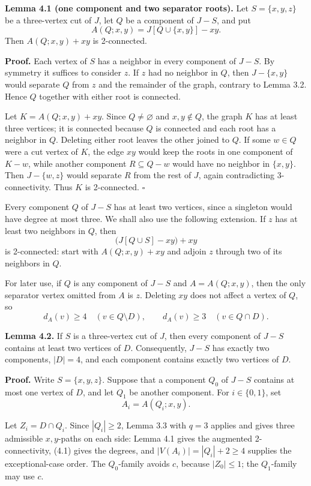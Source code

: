 \documentclass[
  11pt]{article}
\begin{document}
\textbf{Lemma 4.1 (one component and two separator roots).} Let
\(S=\{x,y,z\}\) be a three-vertex cut of \(J\), let \(Q\) be a component
of \(J-S\), and put \[
 A(Q;x,y)=J[Q\cup\{x,y\}]-xy.
\] Then \(A(Q;x,y)+xy\) is 2-connected.

\textbf{Proof.} Each vertex of \(S\) has a neighbor in every component
of \(J-S\). By symmetry it suffices to consider \(z\). If \(z\) had no
neighbor in \(Q\), then \(J-\{x,y\}\) would separate \(Q\) from \(z\)
and the remainder of the graph, contrary to Lemma 3.2. Hence \(Q\)
together with either root is connected.

Let \(K=A(Q;x,y)+xy\). Since \(Q\ne\varnothing\) and \(x,y\notin Q\),
the graph \(K\) has at least three vertices; it is connected because
\(Q\) is connected and each root has a neighbor in \(Q\). Deleting
either root leaves the other joined to \(Q\). If some \(w\in Q\) were a
cut vertex of \(K\), the edge \(xy\) would keep the roots in one
component of \(K-w\), while another component \(R\subseteq Q-w\) would
have no neighbor in \(\{x,y\}\). Then \(J-\{w,z\}\) would separate \(R\)
from the rest of \(J\), again contradicting 3-connectivity. Thus \(K\)
is 2-connected. \(\square\)

Every component \(Q\) of \(J-S\) has at least two vertices, since a
singleton would have degree at most three. We shall also use the
following extension. If \(z\) has at least two neighbors in \(Q\), then
\[
 \bigl(J[Q\cup S]-xy\bigr)+xy
\] is 2-connected: start with \(A(Q;x,y)+xy\) and adjoin \(z\) through
two of its neighbors in \(Q\).

For later use, if \(Q\) is any component of \(J-S\) and \(A=A(Q;x,y)\),
then the only separator vertex omitted from \(A\) is \(z\). Deleting
\(xy\) does not affect a vertex of \(Q\), so \[
 d_A(v)\ge4\quad(v\in Q\setminus D),
 \qquad
 d_A(v)\ge3\quad(v\in Q\cap D). \tag{4.1}
\]

\textbf{Lemma 4.2.} If \(S\) is a three-vertex cut of \(J\), then every
component of \(J-S\) contains at least two vertices of \(D\).
Consequently, \(J-S\) has exactly two components, \(|D|=4\), and each
component contains exactly two vertices of \(D\).

\textbf{Proof.} Write \(S=\{x,y,z\}\). Suppose that a component \(Q_0\)
of \(J-S\) contains at most one vertex of \(D\), and let \(Q_1\) be
another component. For \(i\in\{0,1\}\), set \[
 A_i=A(Q_i;x,y).
\] 

Let \(Z_i=D\cap Q_i\). Since \(|Q_i|\ge2\), Lemma 3.3 with \(q=3\)
applies and gives three admissible \(x,y\)-paths on each side: Lemma 4.1
gives the augmented 2-connectivity, (4.1) gives the degrees, and
\(|V(A_i)|=|Q_i|+2\ge4\) supplies the exceptional-case order. The
\(Q_0\)-family avoids \(c\), because \(|Z_0|\le1\); the \(Q_1\)-family
may use \(c\).
\end{document}
